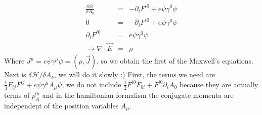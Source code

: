 \documentclass[aps,preprint,preprintnumbers,nofootinbib,showpacs,prd]{revtex4-1}
\newcommand{\nbea}{\begin{eqnarray*}}
\newcommand{\neea}{\end{eqnarray*}}
\begin{document}
%
\nbea
\frac{\delta \mathcal{H}}{\delta A_0} & = & -\partial_i F^{i 0} + e \overline \psi \gamma^0 \psi	\\
0 & = & -\partial_i F^{i 0} + e \overline \psi \gamma^0 \psi	\\
\partial_i F^{i 0} & = & e \overline \psi \gamma^0 \psi \\
\rightarrow \nabla \cdot \vec E & = & \rho
\neea
%
Where $J^\mu = e \overline \psi \gamma^\mu \psi = (\rho, \vec J) $, so we obtain the first of the Maxwell's equations. Next is ${\delta \mathcal{H}}/{\delta A_k}$, we will do it slowly :) First, the terms we need are $ \frac{1}{4} F_{ij}F^{ij} + e \overline \psi \gamma^\mu A_\mu \psi$, we do not include $\frac{1}{2} F^{i 0} F_{0 i} + F^{i 0} \partial_i A_0$ because they are actually terms of $p_A^{0i}$ and in the hamiltonian formalism the conjugate momenta are independent of the position variables $A_\mu$.
\end{document}
